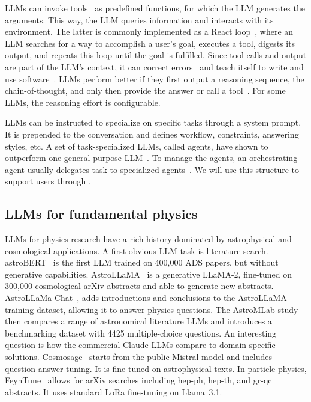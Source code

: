 \documentclass[submission, Phys]{SciPost}
\begin{document}
LLMs can invoke tools~\cite{parisi2022talm, schick2023toolformer} as predefined functions, for which the LLM generates the arguments. This way, the LLM queries information and interacts with its environment. The latter is commonly implemented as a React loop~\cite{yao2022react}, where an LLM searches for a way to accomplish a user's goal, executes a tool, digests its output, and repeats this loop until the goal is fulfilled. Since tool calls and output are part of the LLM's context, it can correct errors~\cite{chen2023teaching} and teach itself to write and use software~\cite{wang2023voyager, cai2023large, yang2024swe}. LLMs perform better if they first output a reasoning sequence, the chain-of-thought, and only then provide the answer or call a tool~\cite{wei2022chain}. For some LLMs, the reasoning effort is configurable. 

LLMs can be instructed to specialize on specific tasks through a system prompt. It is prepended to the conversation and defines workflow, constraints, answering styles, etc. A set of task-specialized LLMs, called agents, have shown to outperform one general-purpose LLM~\cite{du2023improving, liu2023dynamic, wang2024survey}. To manage the agents, an orchestrating agent usually delegates task to specialized agents~\cite{hong2023metagpt, chen2024survey}. We will use this structure to support \mg users through \ma.

\subsection{LLMs for fundamental physics}

LLMs for physics research have a rich history dominated by astrophysical and cosmological applications. A first obvious LLM task is literature search. astroBERT~\cite{grezes2021buildingastrobertlanguagemodel} is the first LLM trained on 400,000 ADS papers, but without generative capabilities.  AstroLLaMA~\cite{Nguyen:2023nhp} is a generative LLaMA-2, fine-tuned on 300,000 cosmological arXiv abstracts and able to generate new abstracts. AstroLLaMa-Chat~\cite{UniverseTBD:2024pmh}, adds introductions and conclusions to the AstroLLaMA training dataset, allowing it to answer physics questions. The AstroMLab study~\cite{ting2024astromlab1winsastronomy} then compares a range of astronomical literature LLMs and introduces a benchmarking dataset with 4425 multiple-choice questions. An interesting question is how the commercial Claude LLMs compare to domain-specific solutions. Cosmosage~\cite{deHaan:2024ybs} starts from the public Mistral model and includes question-answer tuning. It is fine-tuned on astrophysical texts. In particle physics, FeynTune~\cite{Richmond:2025lzg} allows for arXiv searches including hep-ph, hep-th, and gr-qc abstracts. It uses standard  LoRa fine-tuning on Llama~3.1.
\end{document}
